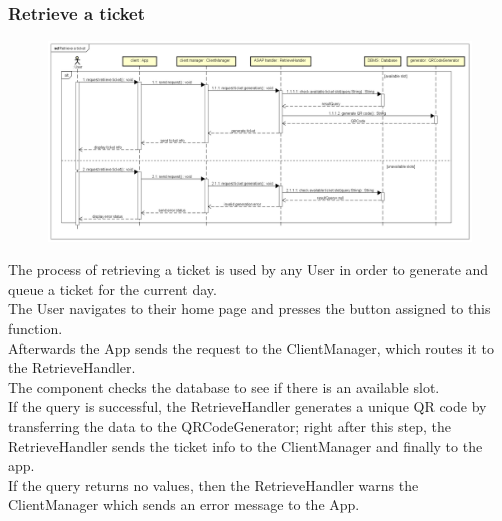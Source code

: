 \documentclass[table, 12pt]{article}
\begin{document}
\subsubsection{Retrieve a ticket}
\begin{figure}[H]
    \begin{center}
        \includegraphics[width=\textwidth]{assets/Sequence-Diagram/retrieve-a-ticket.png}
    \end{center}
\end{figure}
The process of retrieving a ticket is used by any User in order to generate and queue a ticket for the current day. \\
The User navigates to their home page and presses the button assigned to this function.\\
Afterwards the App sends the request to the ClientManager, which routes it to the RetrieveHandler. \\
The component checks the database to see if there is an available slot.\\
If the query is successful, the RetrieveHandler generates a unique QR code by transferring the data to the QRCodeGenerator; right after this step, the RetrieveHandler sends the ticket info to the ClientManager and finally to the app.\\
If the query returns no values, then the RetrieveHandler warns the ClientManager which sends an error message to the App.
\end{document}

